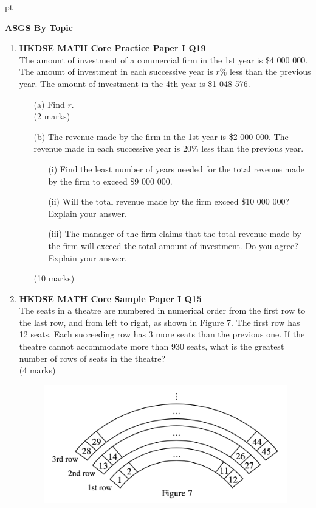 \documentclass[12pt]{article}
\begin{document}
 pt
\begin{center}
	{\large \bf ASGS By Topic}
\end{center}
\vspace{0.05cm}

\begin{enumerate}
	\item \textbf{HKDSE MATH Core Practice Paper I Q19}\\
	The amount of investment of a commercial firm in the 1st year is \$4 000 000. The amount of investment in each successive year is $r \%$ less than the previous year. The amount of investment in the 4th year is \$1 048 576.
	\begin{enumerate}
		\item[(a)] Find $r$. \\(2 marks)
		\item[(b)] The revenue made by the firm in the 1st year is \$2 000 000. The revenue made in each successive year is 20\% less than the previous year.
		\begin{enumerate}
			\item[(i)] Find the least number of years needed for the total revenue made by the firm to exceed \$9 000 000.
			\item[(ii)] Will the total revenue made by the firm exceed \$10 000 000? Explain your answer.
			\item[(iii)] The manager of the firm claims that the total revenue made by the firm will exceed the total amount of investment. Do you agree? Explain your answer.	
		\end{enumerate}
		(10 marks)
	\end{enumerate}

	\item \textbf{HKDSE MATH Core Sample Paper I Q15}\\
	The seats in a theatre are numbered in numerical order from the first row to the last row, and from left to right, as shown in Figure 7. The first row has 12 seats. Each succeeding row has 3 more seats than the previous one. If the theatre cannot accommodate more than 930 seats, what is the greatest number of rows of seats in the theatre? \\(4 marks)
	\begin{figure}[H]
		\centering
		\includegraphics[width = .5\linewidth]{SPFigure1.7}
	\end{figure}


\end{enumerate}
\end{document}
